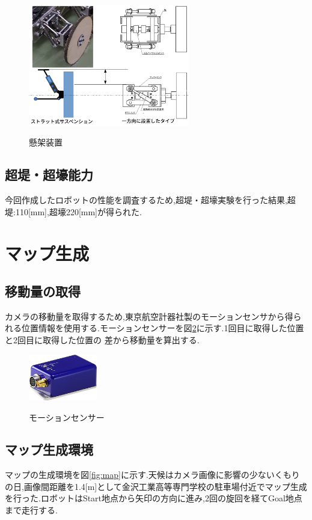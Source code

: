 \documentclass[twocolumn,11pt]{sotsuken_abst}
\begin{document}
\begin{figure}[htp]
 \begin{center}
  \includegraphics[width=70mm]{image/3.png}
 　\caption{懸架装置}
  \label{fig:kenka}%
 \end{center}
\end{figure}
\subsection{超堤・超壕能力}
今回作成したロボットの性能を調査するため,超堤・超壕実験を行った結果,超堤:110[mm],超壕220[mm]が得られた.

\section{マップ生成}
\subsection{移動量の取得}
カメラの移動量を取得するため,東京航空計器社製のモーションセンサから得られる位置情報を使用する.モーションセンサーを図\ref{fig:motion}に示す.1回目に取得した位置と2回目に取得した位置の
差から移動量を算出する.

\begin{figure}[htp]
 \begin{center}
  \includegraphics[width=30mm]{image/motion.jpg}
 　\caption{モーションセンサー}
  \label{fig:motion}%
 \end{center}
\end{figure}

\subsection{マップ生成環境}
マップの生成環境を図\ref{fig:map}に示す.天候はカメラ画像に影響の少ないくもりの日,画像間距離を1.4[m]として金沢工業高等専門学校の駐車場付近でマップ生成を行った.ロボットはStart地点から矢印の方向に進み,2回の旋回を経てGoal地点まで走行する.
\end{document}
